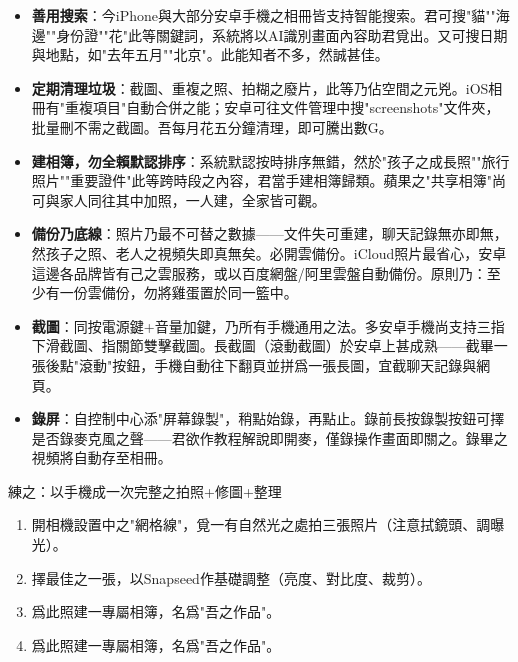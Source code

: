 \begin{itemize}
  \item \textbf{善用搜索}：今iPhone與大部分安卓手機之相冊皆支持智能搜索。君可搜"貓""海邊""身份證""花"此等關鍵詞，系統將以AI識別畫面內容助君覓出。又可搜日期與地點，如"去年五月""北京"。此能知者不多，然誠甚佳。
  \item \textbf{定期清理垃圾}：截圖、重複之照、拍糊之廢片，此等乃佔空間之元兇。iOS相冊有"重複項目"自動合併之能；安卓可往文件管理中搜"screenshots"文件夾，批量刪不需之截圖。吾每月花五分鐘清理，即可騰出數G。
  \item \textbf{建相簿，勿全賴默認排序}：系統默認按時排序無錯，然於"孩子之成長照""旅行照片""重要證件"此等跨時段之內容，君當手建相簿歸類。蘋果之"共享相簿"尚可與家人同往其中加照，一人建，全家皆可觀。
  \item \textbf{備份乃底線}：照片乃最不可替之數據——文件失可重建，聊天記錄無亦即無，然孩子之照、老人之視頻失即真無矣。必開雲備份。iCloud照片最省心，安卓這邊各品牌皆有己之雲服務，或以百度網盤/阿里雲盤自動備份。原則乃：至少有一份雲備份，勿將雞蛋置於同一籃中。
\end{itemize}


\begin{itemize}
  \item \textbf{截圖}：同按電源鍵+音量加鍵，乃所有手機通用之法。多安卓手機尚支持三指下滑截圖、指關節雙擊截圖。長截圖（滾動截圖）於安卓上甚成熟——截畢一張後點"滾動"按鈕，手機自動往下翻頁並拼爲一張長圖，宜截聊天記錄與網頁。
  \item \textbf{錄屏}：自控制中心添"屏幕錄製"，稍點始錄，再點止。錄前長按錄製按鈕可擇是否錄麥克風之聲——君欲作教程解說即開麥，僅錄操作畫面即關之。錄畢之視頻將自動存至相冊。
\end{itemize}

\begin{tcbpractice}{練之：以手機成一次完整之拍照+修圖+整理}
\begin{enumerate}
  \item 開相機設置中之"網格線"，覓一有自然光之處拍三張照片（注意拭鏡頭、調曝光）。
  \item 擇最佳之一張，以Snapseed作基礎調整（亮度、對比度、裁剪）。
  \item 爲此照建一專屬相簿，名爲"吾之作品"。
  \item 爲此照建一專屬相簿，名爲"吾之作品"。
\end{enumerate}

\end{tcbpractice}
